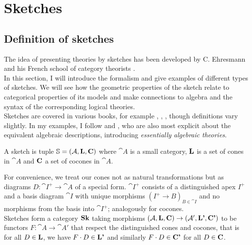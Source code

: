\section{Sketches}
\label{sec:sketches}

\subsection{Definition of sketches}

The idea of presenting theories by sketches has been developed by C. Ehresmann and his French school of category theorists \cite{Ehresmann}. \\

In this section, I will introduce the formalism and give examples of different types of sketches. We will see how the geometric properties of the sketch relate to categorical properties of its models and make connections to algebra and the syntax of the corresponding logical theories. \\

Sketches are covered in various books, for example \cite{MakkaiPare}, \cite{CTCS}, \cite{TTT}, though definitions vary slightly. In my examples, I follow \cite[Chapter D2.1]{elephant} and \cite[Chapter 1.C]{AdamekRosicky}, who are also most explicit about the equivalent algebraic descriptions, introducing \emph{essentially algebraic theories}.

\begin{Definition}[Sketch]
A sketch is tuple $\mathbb S = (\mathcal{A}, \textbf{L}, \textbf{C})$ where $\cat A$ is a small category, $\textbf{L}$ is a set of cones in $\cat A$ and $\textbf{C}$ a set of cocones in $\cat A$.
\end{Definition}

For convenience, we treat our cones not as natural transformations but as diagrams $D : \cat I^+ \to \cat A$ of a special form. $\cat I^+$ consists of a distinguished apex $I^+$ and a basis diagram $\cat I$ with unique morphisms $(I^+ \to B)_{B \in \cat I}$ and no morphisms from the basis into $\cat I^+$; analogously for cocones. \\

Sketches form a category $\mathbf{Sk}$ taking morphisms $(\mathcal{A}, \textbf{L}, \textbf{C}) \to (\mathcal{A}', \textbf{L'}, \textbf{C'})$ to be functors $F : \cat A \to \cat A'$ that respect the distinguished cones and cocones, that is for all $D \in \textbf{L}$, we have $F \cdot D \in \textbf{L'}$ and similarly $F \cdot D \in \textbf{C'}$ for all $D \in \textbf{C}$. \\

